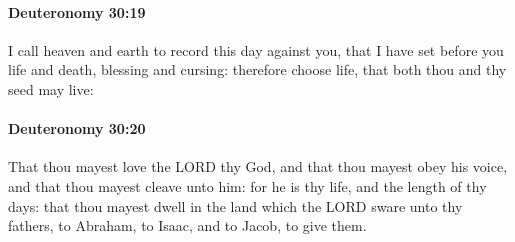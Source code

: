 		\paragraph{Deuteronomy 30:19} %
			\label{DEUTERONOMY-30-19}

			I call heaven and earth to record this day against you, that I have set before you life and death, blessing and cursing: therefore choose life, that both thou and thy seed may live:


		\paragraph{Deuteronomy 30:20} %
			\label{DEUTERONOMY-30-20}

			That thou mayest love the LORD thy God, and that thou mayest obey his voice, and that thou mayest cleave unto him: for he is thy life, and the length of thy days: that thou mayest dwell in the land which the LORD sware unto thy fathers, to Abraham, to Isaac, and to Jacob, to give them.

